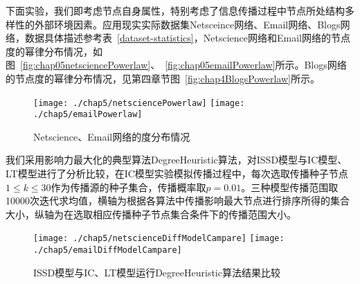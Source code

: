 下面实验，我们即考虑节点自身属性，特别考虑了信息传播过程中节点所处结构多样性的外部环境因素。应用现实实际数据集Netsceince网络、Email网络、Blogs网络，数据具体描述参考表~\ref{dataset-statistics}，Netscience网络和Email网络的节点度的幂律分布情况，如图~\ref{fig:chap05netsciencePowerlaw}、~\ref{fig:chap05emailPowerlaw}所示。Blogs网络的节点度的幂律分布情况，见第四章节图~\ref{fig:chap4BlogsPowerlaw}所示。
\begin{figure}[H]
	\centering%
	{\texttt{[image: ./chap5/netsciencePowerlaw]}}
	{\texttt{[image: ./chap5/emailPowerlaw]}}
	
	\caption{Netscience、Email网络的度分布情况}
\end{figure}



我们采用影响力最大化的典型算法DegreeHeuristic算法\cite{kempe2003maximizing}，对ISSD模型与IC模型、LT模型进行了分析比较，在IC模型实验模拟传播过程中，每次选取传播种子节点$1 \leq k \leq 30$作为传播源的种子集合，传播概率取$p=0.01$。三种模型传播范围取10000次迭代求均值，横轴为根据各算法中传播影响最大节点进行排序所得的集合大小，纵轴为在选取相应传播种子节点集合条件下的传播范围大小。

\begin{figure}[H]
	\centering%
	{\texttt{[image: ./chap5/netscienceDiffModelCampare]}}
	{\texttt{[image: ./chap5/emailDiffModelCampare]}}
	
	\caption{ISSD模型与IC、LT模型运行DegreeHeuristic算法结果比较}
\end{figure}

